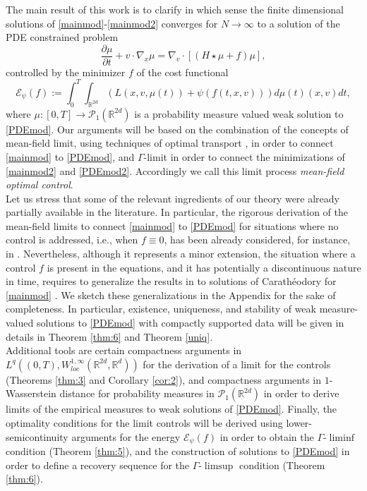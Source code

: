 \documentclass[11pt]{article}
\theoremstyle{plain}
\theoremstyle{definition}
\theoremstyle{remark}
\numberwithin{equation}{section}
\begin{document}
The main result of this work is to clarify in which sense the finite dimensional solutions of \eqref{mainmod}-\eqref{mainmod2} converges for $N \to \infty$ to a solution of the
PDE constrained problem
\begin{equation}\label{PDEmod}
\frac{\partial \mu}{\partial t} + v \cdot \nabla_x \mu = \nabla_v \cdot \left [ \left ( H \star \mu + f \right ) \mu \right ],
\end{equation}
controlled by the minimizer $f$ of the cost functional
\begin{equation}\label{PDEmod2}
\mathcal E_\psi(f) := \int_{0}^T \int_{\mathbb R^{2d}} \left ( L(x,v,\mu(t)) + \psi( f(t,x,v) ) \right ) d\mu(t)(x,v) dt,
\end{equation}
where $\mu:[0,T] \to \mathcal P_1(\mathbb R^{2d})$ is a probability measure valued weak solution to \eqref{PDEmod}. Our arguments will be based on the
combination of the concepts of mean-field limit, using techniques of optimal transport \cite{AGS}, in order to connect \eqref{mainmod} to \eqref{PDEmod},
and $\Gamma$-limit \cite{DM} in order to connect the minimizations of \eqref{mainmod2} and \eqref{PDEmod2}.
Accordingly we call this limit process {\it mean-field optimal control}.\\
 Let us stress that some of the relevant ingredients of our theory were already partially
available in the literature. In particular, the rigorous derivation of the mean-field limits to connect \eqref{mainmod} to \eqref{PDEmod} for situations
where no control is addressed, i.e., when $f \equiv 0$, has been already considered, for instance, in \cite{CanCarRos10}. Nevertheless, although it represents a
minor extension, the situation where a control $f$ is present in the equations, and it has potentially a discontinuous nature in time, requires to generalize
the results in \cite{CanCarRos10} to solutions of Carath{\'e}odory for \eqref{mainmod} \cite{Fil}. We sketch these generalizations in the Appendix for the sake
of completeness. In particular, existence, uniqueness, and stability of weak measure-valued solutions to \eqref{PDEmod} with compactly supported data will be given
in details in Theorem \ref{thm:6} and Theorem \ref{uniq}.\\
Additional tools are certain compactness arguments in $L^q((0,T),W^{1,\infty}_{loc}(\mathbb R^{2d},\mathbb R^d))$ for the derivation of a limit for the controls (Theorems \ref{thm:3} and Corollary \ref{cor:2}), and compactness
arguments in $1$-Wasserstein distance for probability measures in $\mathcal P_1(\mathbb R^{2d})$ in order to derive limits of the empirical measures to weak solutions
of \eqref{PDEmod}. Finally, the optimality conditions for the limit controls will be derived using  lower-semicontinuity arguments for the energy 
$\mathcal E_\psi(f)$ in order to obtain the $\Gamma$-$\liminf$ condition (Theorem \ref{thm:5}), and the construction of solutions to \eqref{PDEmod} in order to define a recovery sequence for the 
$\Gamma$-$\limsup$ condition (Theorem \ref{thm:6}).
\\
\end{document}
